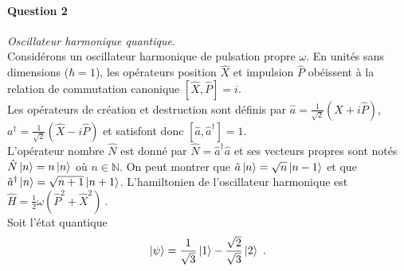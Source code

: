 \paragraph{Question 2} \textit{Oscillateur harmonique quantique.} \\

Considérons un oscillateur harmonique de pulsation propre $\omega$. En unités sans dimensions ($\hbar=1$), les opérateurs position $\hat X$ et impulsion $\hat P$ obéissent à la relation de commutation canonique $[\hat X, \hat P]=i $. \\

Les opérateurs de création et destruction sont définis par 
$\hat a= \frac{1}{\sqrt{2}}(\hat X+i\hat P)$, $a^\dagger= \frac{1}{\sqrt{2}}(\hat X-i\hat P)$ et satisfont donc $[\hat a,\hat a^\dagger]=1$. \\

L'opérateur nombre $\hat N$ est donné par $\hat N= \hat a^\dagger \hat a$ et ses vecteurs propres sont notés $\hat N \ket{n} =n \ket{n}$ où $n \in \mathbb{N}$. On peut montrer que $\hat a \ket{n} =\sqrt{n} \ket{n-1}$ et que $\hat a^\dagger \ket{n} =\sqrt{n+1} \ket{n+1}$. L'hamiltonien de l'oscillateur harmonique est $\hat H = \frac{1}{2}\omega ( \hat P^2 + \hat X^2 )\ $. \\

Soit l'état quantique 
\begin{equation}
\vert \psi \rangle = 
 \frac{1}{\sqrt{3}}\ket{1} -  \frac{\sqrt{2}}{\sqrt{3}}\ket{2}   \ .
 \label{Eq:psi}
\end{equation}

